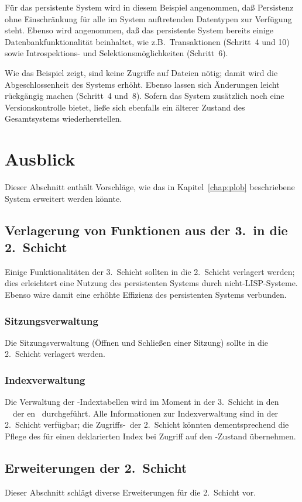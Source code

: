 %
\par{}F\"{u}r das persistente System wird in diesem Beispiel angenommen,
da\ss{} Persistenz ohne Einschr\"{a}nkung f\"{u}r alle im System auftretenden
Datentypen zur Verf\"{u}gung steht.  Ebenso wird angenommen, da\ss{} das
persistente System bereits einige Datenbankfunktionalit\"{a}t beinhaltet,
wie z.B.\ Transaktionen (Schritt~4 und 10) sowie Introspektions- und
Selektionsm\"{o}glichkeiten (Schritt~6).
%
\par{}Wie das Beispiel zeigt, sind keine Zugriffe auf Dateien n\"{o}tig;
damit wird die Abgeschlossenheit des Systems erh\"{o}ht. Ebenso lassen
sich \"{A}nderungen leicht r\"{u}ckg\"{a}ngig machen (Schritt~4 und~8). Sofern
das System zu\-s\"{a}tz\-lich noch eine Versionskontrolle bietet, lie\ss{}e
sich ebenfalls ein \"{a}lterer Zustand des Gesamtsystems wiederherstellen.
%
\section{Ausblick}
%
Dieser Abschnitt enth\"{a}lt Vorschl\"{a}ge, wie das in
Kapitel~\ref{chap:plob} beschriebene System erweitert werden k\"{o}nnte.
%
\subsection{Verlagerung von Funktionen aus der 3.\ in die 2.\ Schicht}
%
Einige Funktionalit\"{a}ten der 3.~Schicht sollten in die 2.~Schicht
verlagert werden; dies erleichtert eine Nutzung des persistenten
Systems durch nicht-LISP-Systeme. Ebenso w\"{a}re damit eine erh\"{o}hte
Effizienz des persistenten Systems verbunden.
%
\subsubsection{Sitzungsverwaltung}
%
Die Sitzungsverwaltung (\"{O}ffnen und Schlie\ss{}en einer Sitzung) sollte
in die 2.~Schicht verlagert werden.
%
\subsubsection{Indexverwaltung}
%
Die Verwaltung der \Slt-Indextabellen wird im Moment in der
3.~Schicht in den \spc[n]\ \mtd[n]\ der
\gfn[n]en \ durchgef\"{u}hrt. Alle
Informationen zur Indexverwaltung sind in der 2.~Schicht verf\"{u}gbar;
die Zugriffs-\fn[en]\ der 2.~Schicht k\"{o}nnten dementsprechend die
Pflege des f\"{u}r einen \Slt\/ deklarierten Index bei Zugriff auf den
\Slt\/-Zustand \"{u}bernehmen.
%
\subsection{Erweiterungen der 2.\ Schicht}%
\label{sec:expiil}%
%
Dieser Abschnitt schl\"{a}gt diverse Erweiterungen f\"{u}r die 2.~Schicht
vor.
%
